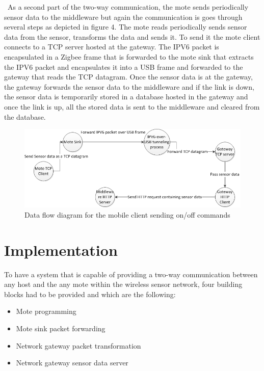 \documentclass[conference]{IEEEtran}
\begin{document}
\
As a second part of the two-way communication, the mote sends periodically sensor data to the middleware but again the communication is goes through several steps as depicted in figure 4.
\linebreak 
The mote reads periodically sends sensor data from the sensor, transforms the data and sends it. To send it the mote client connects to a TCP server hosted at the gateway. The IPV6 packet is encapsulated in a Zigbee frame that is forwarded to the mote  sink that extracts the IPV6 packet and  encapsulates it into a USB frame and forwarded to the gateway that reads the TCP datagram. Once the sensor data is at the gateway, the gateway forwards the sensor data to the middleware and if the link is down, the sensor data is temporarily stored in a database hosted in the gateway and once the link is up, all the stored data is sent to the middleware and cleared from the database.

\begin{figure}[htbp]
\centering
\includegraphics[scale=3.0]{images/send_sensor_data_data_flow.jpg}
\caption{Data flow diagram for the mobile client sending on/off commands}
\label{fig:control_appliance}
\end{figure}


\section{Implementation}
To have a system that is capable of providing a two-way communication between any host and the any mote within the wireless sensor network, four building blocks had to be provided and which are the following:
\begin{itemize}
\item Mote programming
\item Mote sink packet forwarding
\item Network gateway packet transformation
\item Network gateway sensor data server
\end{itemize}
\end{document}
